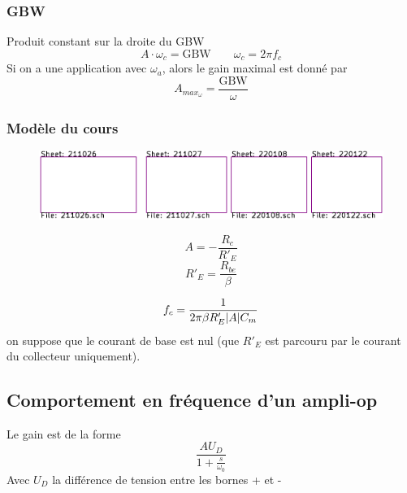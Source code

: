 \documentclass[resume]{subfiles}
\begin{document}
\begin{multicols}{3}
\subsubsection{GBW}
Produit constant sur la droite du GBW
$$A\cdot \omega_c = \text{GBW}\qquad \omega_c=2\pi f_c$$
Si on a une application avec $\omega_a$, alors le gain maximal est donné par
$$A_{max_\omega}=\frac{\text{GBW}}{\omega}$$
\subsubsection{Modèle du cours}
\begin{figure}[H]
\centering
\includegraphics[scale=1,page=10]{../KiCad/resume-crop.pdf}
\end{figure}
$$A=-\frac{R_c}{R'_E}$$
$$R'_E=\frac{R_{be}}{\beta}$$

$$f_c=\frac{1}{2\pi \beta R'_E \abs{A} C_m}$$
on suppose que le courant de base est nul (que $R'_E$ est parcouru par le courant du collecteur uniquement).
\subsection{Comportement en fréquence d'un ampli-op}
Le gain est de la forme
$$\boxed{\frac{AU_D}{1+\frac{s}{\omega_0}}}$$
Avec $U_D$ la différence de tension entre les bornes + et -

\end{multicols}
\end{document}
